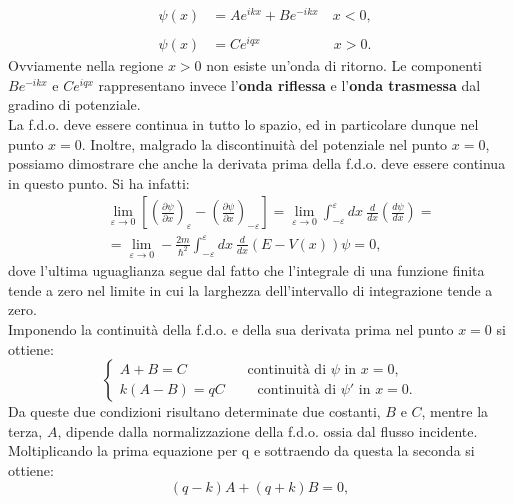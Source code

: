 \documentclass[a4paper,12pt,twoside]{book}
\begin{document}
\begin{eqnarray}
&\psi(x)& = Ae^{ikx}+Be^{-ikx} \quad x<0,\nonumber\\
\\
&\psi(x)& = Ce^{iqx} \qquad \ \quad \qquad x>0.\nonumber
\end{eqnarray}
Ovviamente nella regione $x>0$ non esiste un'onda di ritorno. Le componenti $\displaystyle{Be^{-ikx}}$ e $\displaystyle{Ce^{iqx}}$ rappresentano invece l'\textbf{onda riflessa} e l'\textbf{onda trasmessa} dal gradino di potenziale.\\
La f.d.o. deve essere continua in tutto lo spazio, ed in particolare dunque nel punto $x=0$. Inoltre, malgrado la discontinuità del potenziale nel punto $x=0$, possiamo dimostrare che anche la derivata prima della f.d.o. deve essere continua in questo punto. Si ha infatti:
\begin{eqnarray}
& &\lim _{\varepsilon \rightarrow 0 } \left[ \left( \frac{\partial \psi}{\partial x}\right) _{\varepsilon}-\left( \frac{\partial \psi}{\partial x}\right)_{-\varepsilon}\right]=\lim _{\varepsilon \rightarrow 0 } \int_{-\varepsilon} ^{\varepsilon} dx\ \frac{d}{dx} \left( \frac{d\psi}{dx}\right)= \nonumber \\
& & = \lim _{\varepsilon \rightarrow 0 } -\frac{2m}{\hbar ^2}\int_{-\varepsilon} ^{\varepsilon} dx\ \frac{d}{dx} \left(E-V(x) \right)\psi=0,
\end{eqnarray}
dove l'ultima uguaglianza segue dal fatto che l'integrale di una funzione finita tende a zero nel limite in cui la larghezza dell'intervallo di integrazione tende a zero.\\
Imponendo la continuità della f.d.o. e della sua derivata prima nel punto $x=0$ si ottiene:
\begin{equation}
\begin{cases}
A+B=C \quad \qquad \quad \textrm{ continuità di }\psi\textrm{ in }x=0,\\
k\left(A-B \right) =qC\qquad \textrm{ continuità di }\psi '\textrm{ in }x=0.
\end{cases}
\end{equation}
Da queste due condizioni risultano determinate due costanti, $B$ e $C$, mentre la terza, $A$, dipende dalla normalizzazione della f.d.o. ossia dal flusso incidente.\\
Moltiplicando la prima equazione per q e sottraendo da questa la seconda si ottiene:
\begin{equation}
\left( q-k \right) A + \left( q+k \right)B=0,
\end{equation}
\end{document}
